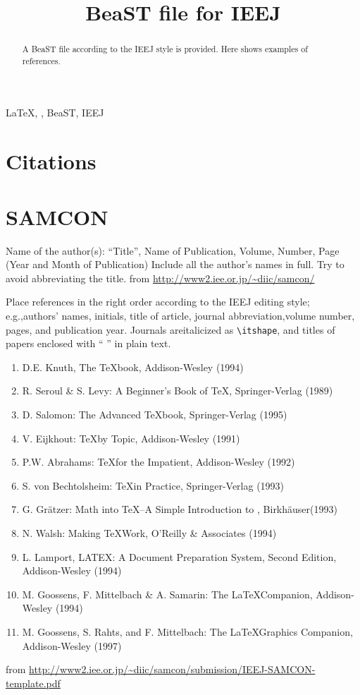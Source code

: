 \documentclass[english,letter]{ieej-e}
\title{BeaST file for IEEJ}
\begin{document}
\begin{abstract}
A BeaST file according to the IEEJ style is provided.
Here shows examples of references.
\end{abstract}
\begin{keyword}
  \LaTeX, , BeaST, IEEJ
\end{keyword}
\maketitle


\section*{Citations}
\Cite{Denki2001,Yamada2001,Knuth1994}


\section{SAMCON}
Name of the author(s): ``Title'', Name of Publication, Volume, Number, Page (Year and Month of Publication)
Include all the author's names in full.
Try to avoid abbreviating the title.
from \url{http://www2.iee.or.jp/~diic/samcon/}

Place references in the right order according to the IEEJ editing style; e.g.,authors' names, initials, title of article, journal abbreviation,volume number, pages, and publication year.
Journals areitalicized as \texttt{\textbackslash itshape}, and titles of papers enclosed with `` '' in plain text.
\footnotesize
\begin{enumerate}
  \item D.E. Knuth, The \TeX{}book, Addison-Wesley (1994)
  \item R. Seroul \& S. Levy: A Beginner's Book of \TeX, Springer-Verlag (1989)
  \item D. Salomon: The Advanced \TeX{}book, Springer-Verlag (1995)
  \item V. Eijkhout: \TeX by Topic, Addison-Wesley (1991)
  \item P.W. Abrahams: \TeX for the Impatient, Addison-Wesley (1992)
  \item S. von Bechtolsheim: \TeX in Practice, Springer-Verlag (1993)
  \item G. Gr\"atzer: Math into \TeX–A Simple Introduction to , Birkh\"auser(1993)
  \item N. Walsh: Making \TeX Work, O'Reilly \& Associates (1994)
  \item L. Lamport, LATEX:  A Document Preparation System, Second Edition, Addison-Wesley (1994)
  \item M. Goossens, F. Mittelbach \& A. Samarin: The \LaTeX Companion, Addison-Wesley (1994)
  \item M. Goossens, S. Rahts, and F. Mittelbach: The \LaTeX Graphics Companion, Addison-Wesley (1997)
\end{enumerate}
\normalsize
from \url{http://www2.iee.or.jp/~diic/samcon/submission/IEEJ-SAMCON-template.pdf}
\end{document}
